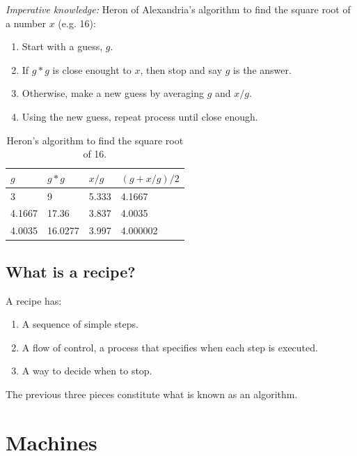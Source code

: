 \documentclass[a4paper]{article}
\begin{document}
\textit{Imperative knowledge:} Heron of Alexandria's algorithm to find the
square root of a number $x$ (e.g. 16):

\begin{enumerate}
  \item Start with a guess, $g$.
  \item If $g * g$ is close enought to $x$, then stop and say $g$ is the
        answer.
  \item Otherwise, make a new guess by averaging $g$ and $x/g$.
  \item Using the new guess, repeat process until close enough.
\end{enumerate}


\begin{table}[h!]
\begin{center}
  \begin{tabular}{|p{2.0cm}|p{2.0cm}|p{2.0cm}|p{2.0cm}|}
    \hline
    $g$ & $g * g$ & $x / g$ & $(g + x / g) / 2$\\
    \hline
    3 & 9 & 5.333 & 4.1667\\
    \hline
    4.1667 & 17.36 & 3.837 & 4.0035\\
    \hline
    4.0035 & 16.0277 & 3.997 & 4.000002\\
    \hline
  \end{tabular}
\caption{Heron's algorithm to find the square root of 16.}
\end{center}
\end{table}

\subsection{What is a recipe?}

A recipe has:

\begin{enumerate}
  \item A sequence of simple steps.
  \item A flow of control, a process that specifies when each step is executed.
  \item A way to decide when to stop.
\end{enumerate}

The previous three pieces constitute what is known as an algorithm.

\section{Machines}
\end{document}

